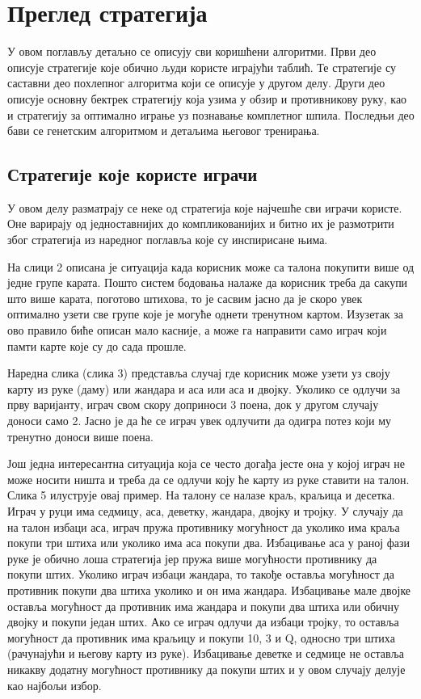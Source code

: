 \documentclass[a4paper, 12pt, ngerman]{article}
\let\oldsection\section
\renewcommand\section{\clearpage\oldsection}
\let\oldsubsection\subsection
\renewcommand\subsection{\clearpage\oldsubsection}
\begin{document}
\section{Преглед стратегија}
У овом поглављу детаљно се описују сви коришћени алгоритми. Први део описује стратегије које обично људи користе играјући таблић. Те стратегије су саставни део похлепног алгоритма који се описује у другом делу. Други део описује основну бектрек стратегију која узима у обзир и противникову руку, као и стратегију за оптимално играње уз познавање комплетног шпила. Последњи део бави се генетским алгоритмом и детаљима његовог тренирања.

\subsection{Стратегије које користе играчи}
У овом делу разматрају се неке од стратегија које најчешће сви играчи користе. Оне варирају од једноставнијих до компликованијих и битно их је размотрити због стратегија из наредног поглавља које су инспирисане њима.

На слици 2 описана је ситуација када корисник може са талона покупити више од једне групе карата. Пошто систем бодовања налаже да корисник треба да сакупи што више карата, поготово штихова, то је сасвим јасно да је скоро увек оптимално узети све групе које је могуће однети тренутном картом. Изузетак за ово правило биће описан мало касније, а може га направити само играч који памти карте које су до сада прошле.

Наредна слика (слика 3) представља случај где корисник може узети уз своју карту из руке (даму) или жандара и аса или аса и двојку. Уколико се одлучи за прву варијанту, играч свом скору доприноси 3 поена, док у другом случају доноси само 2. Јасно је да ће се играч увек одлучити да одигра потез који му тренутно доноси више поена.

Још једна интересантна ситуација која се често догађа јесте она у којој играч не може носити ништа и треба да се одлучи коју ће карту из руке ставити на талон. Слика 5 илуструје овај пример. На талону се налазе краљ, краљица и десетка. Играч у руци има седмицу, аса, деветку, жандара, двојку и тројку. У случају да на талон избаци аса, играч пружа противнику могућност да уколико има краља покупи три штиха или уколико има аса покупи два. Избацивање аса у раној фази руке је обично лоша стратегија јер пружа више могућности противнику да покупи штих. Уколико играч избаци жандара, то такође оставља могућност да противник покупи два штиха уколико и он има жандара. Избацивање мале двојке оставља могућност да противник има жандара и покупи два штиха или обичну двојку и покупи један штих. Ако се играч одлучи да избаци тројку, то оставља могућност да противник има краљицу и покупи 10, 3 и Q, односно три штиха (рачунајући и његову карту из руке). Избацивање деветке и седмице не оставља никакву додатну могућност противнику да покупи штих и у овом случају делује као најбољи избор.
\end{document}
